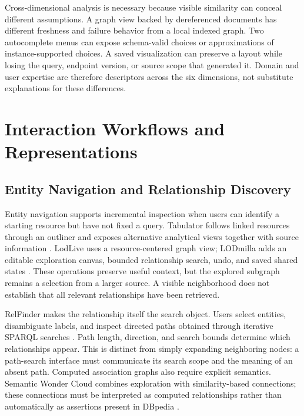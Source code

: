 \documentclass[manuscript,review,screen]{acmart}
\begin{document}
Cross-dimensional analysis is necessary because visible similarity can conceal different assumptions. A graph view backed by dereferenced documents has different freshness and failure behavior from a local indexed graph. Two autocomplete menus can expose schema-valid choices or approximations of instance-supported choices. A saved visualization can preserve a layout while losing the query, endpoint version, or source scope that generated it. Domain and user expertise are therefore descriptors across the six dimensions, not substitute explanations for these differences.

\section{Interaction Workflows and Representations}
\subsection{Entity Navigation and Relationship Discovery}
Entity navigation supports incremental inspection when users can identify a starting resource but have not fixed a query. Tabulator follows linked resources through an outliner and exposes alternative analytical views together with source information \citep{2006_Berners-Lee_Tabulator_Exploring}. LodLive uses a resource-centered graph view; LODmilla adds an editable exploration canvas, bounded relationship search, undo, and saved shared states \citep{2012_Camarda_LodLive_exploring,2014_AMA_LODmilla_Shared}. These operations preserve useful context, but the explored subgraph remains a selection from a larger source. A visible neighborhood does not establish that all relevant relationships have been retrieved.

RelFinder makes the relationship itself the search object. Users select entities, disambiguate labels, and inspect directed paths obtained through iterative SPARQL searches \citep{2009_Heim_RelFinder_Revealing}. Path length, direction, and search bounds determine which relationships appear. This is distinct from simply expanding neighboring nodes: a path-search interface must communicate its search scope and the meaning of an absent path. Computed association graphs also require explicit semantics. Semantic Wonder Cloud combines exploration with similarity-based connections; these connections must be interpreted as computed relationships rather than automatically as assertions present in DBpedia \citep{V3-02469}.
\end{document}
